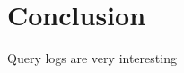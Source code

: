 \documentclass{sig-alternate}
\begin{document}
\section{Conclusion}
\label{sec:conclusion}

Query logs are very interesting

\let\oldsection\section
\renewcommand{\section}[2][1]{\oldsection{#1}\vspace{-3pt}}



\end{document}
